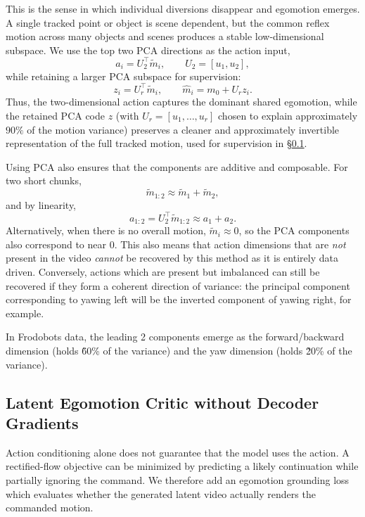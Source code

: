 \documentclass[letterpaper]{article} %
\begin{document}
This is the sense in which individual diversions disappear and egomotion emerges. A single tracked point or object is scene dependent, but the common reflex motion across many objects and scenes produces a stable low-dimensional subspace. We use the top two PCA directions as the action input,
\begin{equation}
    a_i = U_2^\top \tilde m_i,
    \qquad
    U_2=[u_1,u_2],
\end{equation}
while retaining a larger PCA subspace for supervision:
\begin{equation}
    z_i = U_r^\top \tilde m_i,
    \qquad
    \hat m_i = m_0 + U_r z_i.
\end{equation}
Thus, the two-dimensional action captures the dominant shared egomotion, while the retained PCA code $z$ (with $U_r=[u_1,\ldots,u_r]$ chosen to explain approximately $90\%$ of the motion variance) preserves a cleaner and approximately invertible representation of the full tracked motion, used for supervision in \S\ref{sec:critic}.

Using PCA also ensures that the components are additive and composable. For two short chunks,
\begin{equation}
    \tilde m_{1:2}\approx \tilde m_1+\tilde m_2,
\end{equation}
and by linearity,
\begin{equation}
    a_{1:2}=U_2^\top \tilde m_{1:2}
    \approx a_1+a_2.
\end{equation}
Alternatively, when there is no overall motion, $\tilde m_i\approx0$, so the PCA components also correspond to near $0$. This also means that action dimensions that are \emph{not} present in the video \emph{cannot} be recovered by this method as it is entirely data driven. Conversely, actions which are present but imbalanced can still be recovered if they form a coherent direction of variance: the principal component corresponding to yawing left will be the inverted component of yawing right, for example.

In Frodobots data, the leading 2 components emerge as the forward/backward dimension (holds \~60\% of the variance) and the yaw dimension (holds \~20\% of the variance).

\subsection{Latent Egomotion Critic without Decoder Gradients}
\label{sec:critic}

Action conditioning alone does not guarantee that the model uses the action. A rectified-flow objective can be minimized by predicting a likely continuation while partially ignoring the command. We therefore add an egomotion grounding loss which evaluates whether the generated latent video actually renders the commanded motion.
\end{document}
